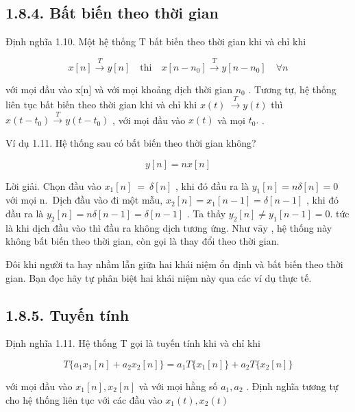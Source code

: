 \documentclass[
  10
]{article}
\begin{document}
\subsection{1.8.4. Bất biến theo thời
gian}\label{bux1ea5t-biux1ebfn-theo-thux1eddi-gian}

Định nghĩa 1.10. Một hệ thống T bất biến theo thời gian khi và chỉ khi

\[
x [ n ] \stackrel {T} {\longrightarrow} y [ n ] \quad \mathrm{thi} \quad x [ n - n _ {0} ] \stackrel {T} {\longrightarrow} y [ n - n _ {0} ] \quad \forall n
\]

với mọi đầu vào x{[}n{]} và với mọi khoảng dịch thời gian \(n _ { 0 }\)
. Tương tự, hệ thống liên tục bất biến theo thời gian khi và chỉ khi
\(x ( t ) \ { \overset { T } { \to } } y ( t )\) thì
\(x ( t - t _ { 0 } ) \overset { T } { \longrightarrow } y ( t - t _ { 0 } )\)
, với mọi đầu vào \(x ( t )\) và mọi \(t _ { 0 } .\) .

Ví dụ 1.11. Hệ thống sau có bất biến theo thời gian không?

\[
y [ n ] = n x [ n ]
\]

Lời giải. Chọn đầu vào \(x _ { 1 } [ n ] \ = \ \delta [ n ]\) , khi đó
đầu ra là \(y _ { 1 } [ n ] = n \delta [ n ] = 0\) với mọi n.~Dịch đầu
vào đi một mẫu,
\(x _ { 2 } [ n ] = x _ { 1 } [ n - 1 ] = \delta [ n - 1 ]\) , khi đó
đầu ra là \(y _ { 2 } [ n ] = n \delta [ n - 1 ] = \delta [ n - 1 ]\) .
Ta thấy \(y _ { 2 } [ n ] \neq y _ { 1 } [ n - 1 ] = 0 .\) tức là khi
dịch đầu vào thì đầu ra không dịch tương ứng. Như
\(\mathrm { v } \mathrm { \hat { a } \mathrm { y } }\) , hệ thống này
không bất biến theo thời gian, còn gọi là thay đổi theo thời gian. 

Đôi khi người ta hay nhầm lẫn giữa hai khái niệm ổn định và bất biến
theo thời gian. Bạn đọc hãy tự phân biệt hai khái niệm này qua các ví dụ
thực tế.

\subsection{1.8.5. Tuyến tính}\label{tuyux1ebfn-tuxednh}

Định nghĩa 1.11. Hệ thống T gọi là tuyến tính khi và chỉ khi

\[
T \{a _ {1} x _ {1} [ n ] + a _ {2} x _ {2} [ n ] \} = a _ {1} T \{x _ {1} [ n ] \} + a _ {2} T \{x _ {2} [ n ] \}
\]

với mọi đầu vào \(x _ { 1 } [ n ] , x _ { 2 } [ n ]\) và với mọi hằng số
\(a _ { 1 } , a _ { 2 }\) . Định nghĩa tương tự cho hệ thống liên tục
với các đầu vào \(x _ { 1 } ( t ) , x _ { 2 } ( t )\)
\end{document}
